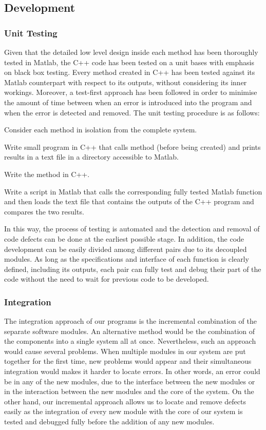 \documentclass[11pt,a4paper]{article}
\begin{document}
\subsection{Development}
\subsubsection{Unit Testing}
\noindent
Given that the detailed low level design inside each method has been thoroughly tested in Matlab, the C++ code has been tested on a unit bases with emphasis on black box testing. Every method created in C++ has been tested against its Matlab counterpart with respect to its outputs, without considering its inner workings. Moreover, a test-first approach has been followed in order to minimise the amount of time between when an error is introduced into the program and when the error is detected and removed. The unit testing procedure is as follows:
\begin{compactitem}
\item Consider each method in isolation from the complete system.
\item Write small program in C++ that calls method (before being created) and prints results in a text file in a directory accessible to Matlab.
\item Write the method in C++.
\item Write a script in Matlab that calls the corresponding fully tested Matlab function and then loads the text file that contains the outputs of the C++ program and compares the two results.
\end{compactitem}

\noindent
In this way, the process of testing is automated and the detection and removal of code defects can be done at the earliest possible stage. In addition, the code development can be easily divided among different pairs due to its decoupled modules. As long as the specifications and interface of each function is clearly defined, including its outputs, each pair can fully test and debug their part of the code without the need to wait for previous code to be developed.

\subsubsection{Integration}
\noindent
The integration approach of our programs is the incremental combination of the separate software modules. An alternative method would be the combination of the components into a single system all at once. Nevertheless, such an approach would cause several problems. When multiple modules in our system are put together for the first time, new problems would appear and their simultaneous integration would makes it harder to locate errors. In other words, an error could be in any of the new modules, due to the interface between the new modules or in the interaction between the new modules and the core of the system. On the other hand, our incremental approach allows us to locate and remove defects easily as the integration of every new module with the core of our system is tested and debugged fully before the addition of any new modules.
 
\end{document}
